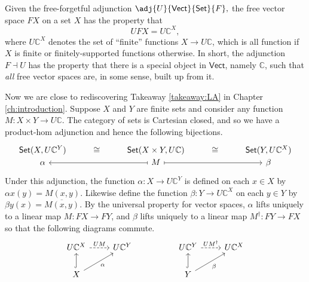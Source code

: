 \begin{takeaway}\label{takeaway:5LA} Given the free-forgetful adjunction $\adj{U}{\mathsf{Vect}}{\mathsf{Set}}{F},$ the free vector space $FX$ on a set $X$ has the property that
  \begin{equation}\label{eq:EforLA}
  UFX=U\mathbb{C}^X,
  \end{equation}
where $U\mathbb{C}^X$ denotes the set of ``finite'' functions $X\to U\mathbb{C}$, which is all function if $X$ is finite or finitely-supported functions otherwise. In short, the adjunction $F\dashv U$ has the property that there is a special object in $\mathsf{Vect}$, namely $\mathbb{C}$, such that \textit{all} free vector spaces are, in some sense, built up from it.
\end{takeaway}

Now we are close to rediscovering Takeaway \ref{takeaway:LA} in Chapter \ref{ch:introduction}. Suppose $X$ and $Y$ are finite sets and consider any function $M\colon X\times Y\to U\mathbb{C}$. The category of sets is Cartesian closed, and so we have a product-hom adjunction and hence the following bijections.
\[
  \begin{tikzcd}
  {\mathsf{Set}(X,U\mathbb{C}^Y)} & \cong & {\mathsf{Set}(X\times Y,U\mathbb{C})}                 & \cong & {\mathsf{Set}(Y,U\mathbb{C}^X)} \\[-20pt]
  \alpha             &       & M \arrow[rr, maps to] \arrow[ll, maps to] &       & \beta            
  \end{tikzcd}
\]
Under this adjunction, the function $\alpha\colon X\to U\mathbb{C}^Y$ is defined on each $x\in X$ by $\alpha x(y)= M(x,y)$. Likewise define the function $\beta\colon Y\to U\mathbb{C}^X$ on each $y\in Y$ by $\beta y(x)=\overline{M(x,y)}$. By the universal property for vector spaces, $\alpha$ lifts uniquely to a linear map $M\colon FX\to FY$, and $\beta$ lifts uniquely to a linear map $M^\dagger \colon FY\to FX$ so that the following diagrams commute.
\begin{equation}\label{diagrams:correctlifts_LA}
  \begin{tikzcd}
  U\mathbb{C}^X \arrow[r, "UM", dashed]         & U\mathbb{C}^Y && U\mathbb{C}^Y \arrow[r, "UM^\dagger ", dashed]         & U\mathbb{C}^X \\
  X \arrow[ru, "\alpha"'] \arrow[u, hook] &     && Y \arrow[u, hook] \arrow[ru, "\beta"'] &    
  \end{tikzcd}
\end{equation}
